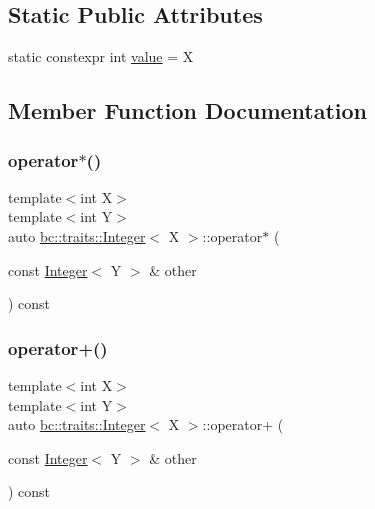 \subsection*{Static Public Attributes}
\begin{DoxyCompactItemize}
\item 
static constexpr int \hyperlink{structbc_1_1traits_1_1Integer_a853b05936b98e64c79163395c3624e32}{value} = X
\end{DoxyCompactItemize}


\subsection{Member Function Documentation}
\mbox{\label{structbc_1_1traits_1_1Integer_a44718761db2de064ee58fb8b0da41468}} 
\subsubsection{\texorpdfstring{operator$\ast$()}{operator*()}}
{\footnotesize\ttfamily template$<$int X$>$ \\
template$<$int Y$>$ \\
auto \hyperlink{structbc_1_1traits_1_1Integer}{bc\+::traits\+::\+Integer}$<$ X $>$\+::operator$\ast$ (\begin{DoxyParamCaption}\item[{const \hyperlink{structbc_1_1traits_1_1Integer}{Integer}$<$ Y $>$ \&}]{other }\end{DoxyParamCaption}) const\hspace{0.3cm}{\ttfamily [inline]}}

\mbox{\label{structbc_1_1traits_1_1Integer_adf0914fdfb886dae697c578fda4fd4a3}} 
\subsubsection{\texorpdfstring{operator+()}{operator+()}}
{\footnotesize\ttfamily template$<$int X$>$ \\
template$<$int Y$>$ \\
auto \hyperlink{structbc_1_1traits_1_1Integer}{bc\+::traits\+::\+Integer}$<$ X $>$\+::operator+ (\begin{DoxyParamCaption}\item[{const \hyperlink{structbc_1_1traits_1_1Integer}{Integer}$<$ Y $>$ \&}]{other }\end{DoxyParamCaption}) const\hspace{0.3cm}{\ttfamily [inline]}}

